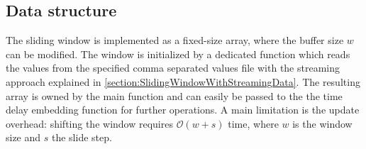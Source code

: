 \subsection{Data structure}
The sliding window is implemented as a fixed-size array, where the buffer size $w$ can be modified. The window is initialized by a dedicated function which reads the values from the specified comma separated values file with the streaming approach explained in \ref{section:SlidingWindowWithStreamingData}. The resulting array is owned by the main function and can easily be passed to the the time delay embedding function for further operations. A main limitation is the update overhead: shifting the window requires $\mathcal{O}(w + s)$ time, where $w$ is the window size and $s$ the slide step.